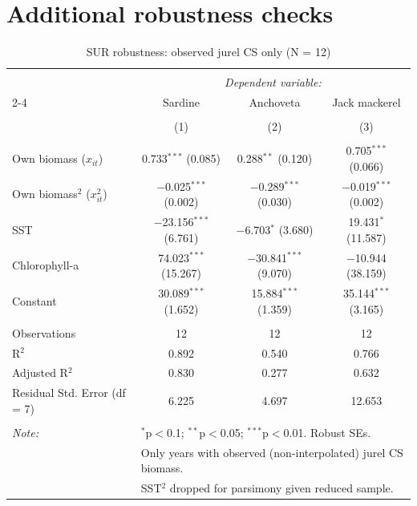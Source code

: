 \documentclass[
  11pt,
]{article}
\begin{document}
\appendix


\section{Additional robustness checks}\label{appendix-robustness}

\begin{table}[!htbp] \centering 
  \caption{SUR robustness: observed jurel CS only (N = 12)} 
  \label{tab:SUR_rob_obs} 
\footnotesize 
\begin{tabular}{@{\extracolsep{5pt}}lccc} 
\\[-1.8ex]\hline 
\hline \\[-1.8ex] 
 & \multicolumn{3}{c}{\textit{Dependent variable:}} \\ 
\cline{2-4} 
 & Sardine & Anchoveta & Jack mackerel \\ 
\\[-1.8ex] & (1) & (2) & (3)\\ 
\hline \\[-1.8ex] 
 Own biomass ($x_{it}$) & 0.733$^{***}$ (0.085) & 0.288$^{**}$ (0.120) & 0.705$^{***}$ (0.066) \\ 
  Own biomass$^2$ ($x_{it}^2$) & $-$0.025$^{***}$ (0.002) & $-$0.289$^{***}$ (0.030) & $-$0.019$^{***}$ (0.002) \\ 
  SST & $-$23.156$^{***}$ (6.761) & $-$6.703$^{*}$ (3.680) & 19.431$^{*}$ (11.587) \\ 
  Chlorophyll-a & 74.023$^{***}$ (15.267) & $-$30.841$^{***}$ (9.070) & $-$10.944 (38.159) \\ 
  Constant & 30.089$^{***}$ (1.652) & 15.884$^{***}$ (1.359) & 35.144$^{***}$ (3.165) \\ 
 \hline \\[-1.8ex] 
Observations & 12 & 12 & 12 \\ 
R$^{2}$ & 0.892 & 0.540 & 0.766 \\ 
Adjusted R$^{2}$ & 0.830 & 0.277 & 0.632 \\ 
Residual Std. Error (df = 7) & 6.225 & 4.697 & 12.653 \\ 
\hline 
\hline \\[-1.8ex] 
\textit{Note:}  & \multicolumn{3}{l}{$^{*}$p$<$0.1; $^{**}$p$<$0.05; $^{***}$p$<$0.01. Robust SEs.} \\ 
 & \multicolumn{3}{l}{Only years with observed (non-interpolated) jurel CS biomass.} \\ 
 & \multicolumn{3}{l}{SST$^2$ dropped for parsimony given reduced sample.} \\ 
\end{tabular} 
\end{table}
\end{document}
